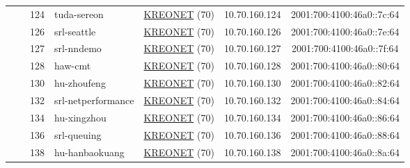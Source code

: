 \begin{small}
\begin{center}
\begin{longtable}{|c|c|c|c|c|c|c|c|}
  &  & \tiny{124} & \multicolumn{1}{|l|}{\tiny{tuda-sereon}} & \multicolumn{2}{|c|}{\tiny{\href{http://www.kreonet.net}{KREONET} (70)}} & \tiny{10.70.160.124} & \tiny{2001:700:4100:46a0::7c:64} \\* \cline{3-3}\cline{4-4}\cline{5-5}\cline{6-6}\cline{7-7}\cline{8-8}
  &  & \tiny{126} & \multicolumn{1}{|l|}{\tiny{srl-seattle}} & \multicolumn{2}{|c|}{\tiny{\href{http://www.kreonet.net}{KREONET} (70)}} & \tiny{10.70.160.126} & \tiny{2001:700:4100:46a0::7e:64} \\* \cline{3-3}\cline{4-4}\cline{5-5}\cline{6-6}\cline{7-7}\cline{8-8}
  &  & \tiny{127} & \multicolumn{1}{|l|}{\tiny{srl-nndemo}} & \multicolumn{2}{|c|}{\tiny{\href{http://www.kreonet.net}{KREONET} (70)}} & \tiny{10.70.160.127} & \tiny{2001:700:4100:46a0::7f:64} \\* \cline{3-3}\cline{4-4}\cline{5-5}\cline{6-6}\cline{7-7}\cline{8-8}
  &  & \tiny{128} & \multicolumn{1}{|l|}{\tiny{haw-cmt}} & \multicolumn{2}{|c|}{\tiny{\href{http://www.kreonet.net}{KREONET} (70)}} & \tiny{10.70.160.128} & \tiny{2001:700:4100:46a0::80:64} \\* \cline{3-3}\cline{4-4}\cline{5-5}\cline{6-6}\cline{7-7}\cline{8-8}
  &  & \tiny{130} & \multicolumn{1}{|l|}{\tiny{hu-zhoufeng}} & \multicolumn{2}{|c|}{\tiny{\href{http://www.kreonet.net}{KREONET} (70)}} & \tiny{10.70.160.130} & \tiny{2001:700:4100:46a0::82:64} \\* \cline{3-3}\cline{4-4}\cline{5-5}\cline{6-6}\cline{7-7}\cline{8-8}
  &  & \tiny{132} & \multicolumn{1}{|l|}{\tiny{srl-netperformance}} & \multicolumn{2}{|c|}{\tiny{\href{http://www.kreonet.net}{KREONET} (70)}} & \tiny{10.70.160.132} & \tiny{2001:700:4100:46a0::84:64} \\* \cline{3-3}\cline{4-4}\cline{5-5}\cline{6-6}\cline{7-7}\cline{8-8}
  &  & \tiny{134} & \multicolumn{1}{|l|}{\tiny{hu-xingzhou}} & \multicolumn{2}{|c|}{\tiny{\href{http://www.kreonet.net}{KREONET} (70)}} & \tiny{10.70.160.134} & \tiny{2001:700:4100:46a0::86:64} \\* \cline{3-3}\cline{4-4}\cline{5-5}\cline{6-6}\cline{7-7}\cline{8-8}
  &  & \tiny{136} & \multicolumn{1}{|l|}{\tiny{srl-queuing}} & \multicolumn{2}{|c|}{\tiny{\href{http://www.kreonet.net}{KREONET} (70)}} & \tiny{10.70.160.136} & \tiny{2001:700:4100:46a0::88:64} \\* \cline{3-3}\cline{4-4}\cline{5-5}\cline{6-6}\cline{7-7}\cline{8-8}
  &  & \tiny{138} & \multicolumn{1}{|l|}{\tiny{hu-hanbaokuang}} & \multicolumn{2}{|c|}{\tiny{\href{http://www.kreonet.net}{KREONET} (70)}} & \tiny{10.70.160.138} & \tiny{2001:700:4100:46a0::8a:64} \\* \cline{3-3}\cline{4-4}\cline{5-5}\cline{6-6}\cline{7-7}\cline{8-8}

\end{longtable}
\end{center}
\end{small}
